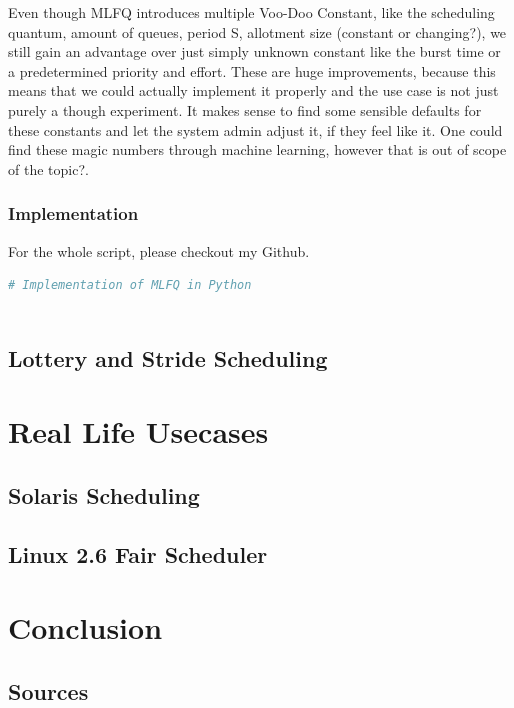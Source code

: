\documentclass{report}
\begin{document}
Even though MLFQ introduces multiple Voo-Doo Constant, like the scheduling quantum, amount of queues, period S, allotment size (constant or changing?), we still gain an advantage over just simply unknown constant like the burst time or a predetermined priority and effort. These are huge improvements, because this means that we could actually implement it properly and the use case is not just purely a though experiment. 
It makes sense to find some sensible defaults for these constants and let the system admin adjust it, if they feel like it. One could find these magic numbers through machine learning, however that is out of scope of the topic?.

\section{Implementation}

For the whole script, please checkout my Github.

\begin{lstlisting}[language=Python, style=colorEX, label=cd:mlfq-python]
  # Implementation of MLFQ in Python
  
\end{lstlisting}

\chapter{Lottery and Stride Scheduling}

\part{Real Life Usecases}

\chapter{Solaris Scheduling}

\chapter{Linux 2.6 Fair Scheduler}



\part{Conclusion}

\chapter*{Sources}
\end{document}

